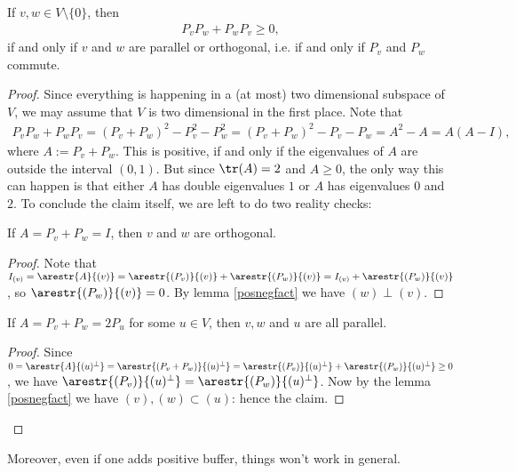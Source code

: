 \begin{prop}\label{symmetric_projection}
	If $v, w \in V \setminus \{0\}$, then
	\begin{align*}
		P_{v} P_{w} + P_{w} P_{v} \geq 0,
	\end{align*}
	if and only if $v$ and $w$ are parallel or orthogonal, i.e. if and only if $P_{v}$ and $P_{w}$ commute.
\end{prop}
\begin{proof}
	Since everything is happening in a (at most) two dimensional subspace of $V$, we may assume that $V$ is two dimensional in the first place. Note that
	\begin{align*}
		P_{v} P_{w} + P_{w} P_{v} = (P_{v} + P_{w})^2 - P_{v}^2 - P_{w}^2 = (P_{v} + P_{w})^2 - P_{v} - P_{w} = A^2 - A = A (A - I),
	\end{align*}
	where $A := P_{v} + P_{w}$. This is positive, if and only if the eigenvalues of $A$ are outside the interval $(0, 1)$. But since $\tr(A) = 2$ and $A \geq 0$, the only way this can happen is that either $A$ has double eigenvalues $1$ or $A$ has eigenvalues $0$ and $2$. To conclude the claim itself, we are left to do two reality checks:
	\begin{lem}
		If $A = P_{v} + P_{w} = I$, then $v$ and $w$ are orthogonal.
	\end{lem}
	\begin{proof}
		Note that $I_{(v)} = \arestr{A}{(v)} = \arestr{(P_{v})}{(v)} + \arestr{(P_{w})}{(v)} = I_{(v)} + \arestr{(P_{w})}{(v)}$, so $\arestr{(P_{w})}{(v)} = 0$. By lemma \ref{posnegfact} we have $(w) \perp (v)$.
	\end{proof}
	\begin{lem}
		If $A = P_{v} + P_{w} = 2 P_{u}$ for some $u \in V$, then $v, w$ and $u$ are all parallel.
	\end{lem}
	\begin{proof}
		Since $0 = \arestr{A}{(u)^{\perp}} = \arestr{(P_{v} + P_{w})}{(u)^{\perp}} = \arestr{(P_{v})}{(u)^{\perp}} + \arestr{(P_{w})}{(u)^{\perp}} \geq 0$, we have $\arestr{(P_{v})}{(u)^{\perp}} =  \arestr{(P_{w})}{(u)^{\perp}}$. Now by the lemma \ref{posnegfact} we have $(v), (w) \subset (u)$: hence the claim.
	\end{proof}
\end{proof}

Moreover, even if one adds positive buffer, things won't work in general.

